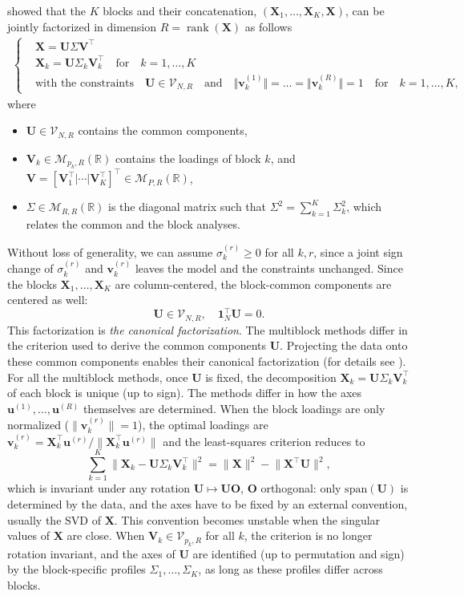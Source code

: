 \documentclass[11pt]{article}
\DeclareMathOperator{\rank}{rank}
\newcommand{\X}{\mathbf{X}}
\newcommand{\U}{\mathbf{U}}
\newcommand{\V}{\mathbf{V}}
\newcommand{\uu}{\mathbf{u}}
\newcommand{\vv}{\mathbf{v}}
\newcommand{\one}{\mathbf{1}}
\newcommand{\Stiefel}[2]{\mathcal V_{#1,#2}}
\begin{document}
\citet{bougeard2024} showed that the $K$ blocks and their concatenation, $(\textbf{X}_1,\ldots,\textbf{X}_K,\textbf{X})$, can be jointly factorized in dimension $R=\rank(\textbf{X})$ as follows
\begin{align}
  \left\{
	\begin{array}{ll}
		&\X   = \U \Sigma \V^\intercal   \\
		&\X_k = \U \Sigma_k \V_k^\intercal \quad \textrm{for} \quad k=1, \dots, K    \\	
		&\textrm{with the constraints} \quad \U\in \Stiefel{N}{R} \quad \textrm{and} \quad \Vert\vv_k^{(1)}\Vert=\ldots=\Vert\vv_k^{(R)}\Vert=1 \quad \textrm{for} \quad k=1, \dots, K, 
	\end{array}
	\right. \label{Cano_Facto}
\end{align}
where
\begin{itemize}
	\item $\U\in \Stiefel{N}{R}$ contains the common components,
\item $\V_k \in \mathcal M_{p_k,R}(\mathbb R)$ contains the loadings of block $k$, and $\V=[\V_1^\intercal|\cdots|\V_K^\intercal]^\intercal \in \mathcal M_{P,R}(\mathbb R)$,
\item $\Sigma\in \mathcal M_{R,R}(\mathbb R)$ is the diagonal matrix such that $\Sigma^2 = \sum_{k=1}^K \Sigma_k^2$, which relates the common and the block analyses.
\end{itemize}
Without loss of generality, we can assume $\sigma_k^{(r)}\geq 0$ for all $k,r$, since a joint sign change of $\sigma_k^{(r)}$ and $\vv_k^{(r)}$ leaves the model and the constraints unchanged. Since the blocks $\X_1,\ldots,\X_K$ are column-centered, the block-common components are centered as well:
\[\U\in\Stiefel{N}{R}, \quad \one_N^\intercal\U=0.\]
This factorization is \textit{the canonical factorization}. The multiblock methods differ in the criterion used to derive the common components $\U$. Projecting the data onto these common components enables their canonical factorization (for details see \cite{bougeard2024}). For all the multiblock methods, once $\U$ is fixed, the decomposition $\X_k=\U\Sigma_k\V_k^\intercal$ of each block is unique (up to sign). The methods differ in how the axes $\uu^{(1)},\ldots,\uu^{(R)}$ themselves are determined. When the block loadings are only normalized ($\|\vv_k^{(r)}\|=1$), the optimal loadings are
$\vv_k^{(r)}=\X_k^\intercal\uu^{(r)}/\|\X_k^\intercal\uu^{(r)}\|$ and the least-squares criterion reduces to
\[
  \sum_{k=1}^K\bigl\|\X_k-\U\Sigma_k\V_k^\intercal\bigr\|^2=\|\X\|^2-\bigl\|\X^\intercal\U\bigr\|^2 ,
\]
which is invariant under any rotation $\U\mapsto\U\mathbf O$, $\mathbf O$ orthogonal: only $\mathrm{span}(\U)$ is determined by the data, and the axes have to be fixed by an external convention, usually the SVD of $\X$. This convention becomes unstable when the singular values of $\X$ are close. When $\V_k\in\Stiefel{p_k}{R}$ for all $k$, the criterion is no longer rotation invariant, and the axes of $\U$ are identified (up to permutation and sign) by the block-specific profiles $\Sigma_1,\ldots,\Sigma_K$, as long as these profiles differ across blocks. 
 
\end{document}
